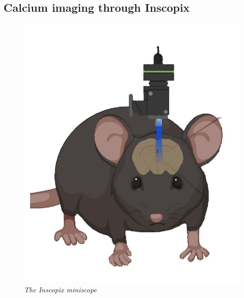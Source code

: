 \documentclass[a4paper]{article}
\begin{document}
\subsection{Calcium imaging through Inscopix}



\begin{figure}[H]
	\begin{center}
		\includegraphics[scale=.35]{Inscopix.jpg} 
	\end{center} 
	\caption{\textit{The Inscopix miniscope}}
	
\end{figure}
\end{document}
